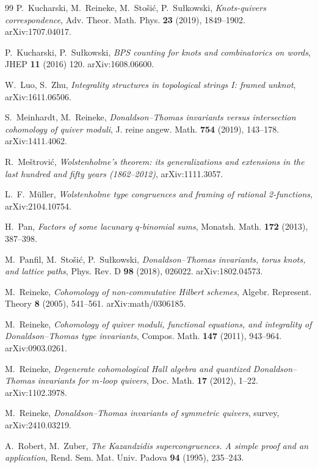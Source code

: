 \documentclass[11pt]{amsart}
\theoremstyle{definition}
\begin{document}
\begin{thebibliography}{99}
 P.~Kucharski, M.~Reineke, M.~Sto\v si\'c, P.~Su\l kowski, \emph{Knots-quivers correspondence}, Adv. Theor. Math. Phys. \textbf{23} (2019), 1849--1902. arXiv:1707.04017.

 P.~Kucharski, P.~Su\l kowski, \emph{BPS counting for knots and combinatorics on words}, JHEP \textbf{11} (2016) 120. arXiv:1608.06600.

 W.~Luo, S.~Zhu, \emph{Integrality structures in topological strings I: framed unknot}, arXiv:1611.06506.

 S.~Meinhardt, M.~Reineke, \emph{Donaldson--Thomas invariants versus intersection cohomology of quiver moduli}, J. reine angew. Math. \textbf{754} (2019), 143--178. arXiv:1411.4062.

 R.~Me\v strovi\'c, \emph{Wolstenholme's theorem: its generalizations and extensions in the last hundred and fifty years (1862--2012)}, arXiv:1111.3057.

 L.~F.~M\"uller, \emph{Wolstenholme type congruences and framing of rational 2-functions}, arXiv:2104.10754.

 H.~Pan, \emph{Factors of some lacunary $q$-binomial sums}, Monatsh. Math. \textbf{172} (2013), 387--398.

 M.~Panfil, M.~Sto\v si\'c, P.~Su\l kowski, \emph{Donaldson--Thomas invariants, torus knots, and lattice paths}, Phys. Rev. D \textbf{98} (2018), 026022. arXiv:1802.04573.

 M.~Reineke, \emph{Cohomology of non-commutative Hilbert schemes}, Algebr. Represent. Theory \textbf{8} (2005), 541--561. arXiv:math/0306185.

 M.~Reineke, \emph{Cohomology of quiver moduli, functional equations, and integrality of Donaldson--Thomas type invariants}, Compos. Math. \textbf{147} (2011), 943--964. arXiv:0903.0261.

 M.~Reineke, \emph{Degenerate cohomological Hall algebra and quantized Donaldson--Thomas invariants for $m$-loop quivers}, Doc. Math. \textbf{17} (2012), 1--22. arXiv:1102.3978.

 M.~Reineke, \emph{Donaldson--Thomas invariants of symmetric quivers}, survey, arXiv:2410.03219.

 A.~Robert, M.~Zuber, \emph{The Kazandzidis supercongruences. A simple proof and an application}, Rend. Sem. Mat. Univ. Padova \textbf{94} (1995), 235--243.


\end{thebibliography}
\end{document}
